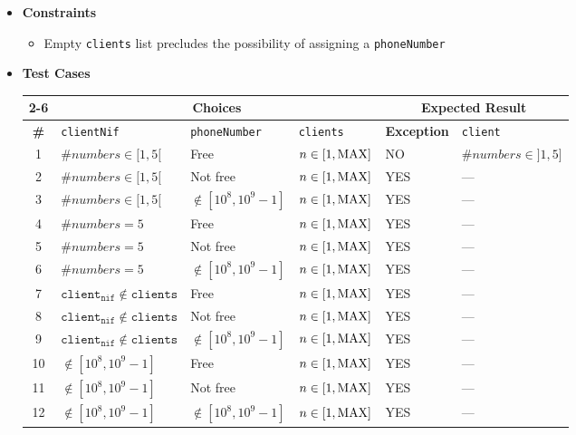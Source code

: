 \begin{itemize}
  \item \textbf{Constraints}
  \begin{itemize}
    \normalsize
    \item Empty \texttt{clients} list precludes the possibility of assigning a
          \texttt{phoneNumber}
  \end{itemize}

  \item \textbf{Test Cases}
  \begin{table}[!hbtp]
    \centering
    \normalsize
    \begin{tabular}{|c|l|l|l|l|l|}
      \cline{2-6}
      \multicolumn{1}{}{}
        & \multicolumn{3}{|c}{\textbf{Choices}}
        & \multicolumn{2}{|c|}{\textbf{Expected Result}} \\
      \hline
      \textbf{\#}
        & \texttt{clientNif} & \texttt{phoneNumber} & \texttt{clients}
        & \textbf{Exception} & \texttt{client} \\
      \hline
       1 & $\#numbers \in [1,5[$ & Free & $n \in [1,\rm{MAX}]$
         & NO & $\#numbers \in ]1,5]$ \\ \hline
       2 & $\#numbers \in [1,5[$ & Not free & $n \in [1,\rm{MAX}]$
         & YES & --- \\ \hline
       3 & $\#numbers \in [1,5[$ & $\notin [10^8,10^9-1]$ & $n \in [1,\rm{MAX}]$
         & YES & --- \\ \hline

       4 & $\#numbers = 5$ & Free & $n \in [1,\rm{MAX}]$
         & YES & --- \\ \hline
       5 & $\#numbers = 5$ & Not free & $n \in [1,\rm{MAX}]$
         & YES & --- \\ \hline
       6 & $\#numbers = 5$ & $\notin [10^8,10^9-1]$ & $n \in [1,\rm{MAX}]$
         & YES & --- \\ \hline


       7 & $\texttt{client}_{\texttt{nif}} \notin \texttt{clients}$
           & Free & $n \in [1,\rm{MAX}]$
         & YES & --- \\ \hline
       8 & $\texttt{client}_{\texttt{nif}} \notin \texttt{clients}$
           & Not free & $n \in [1,\rm{MAX}]$
         & YES & --- \\ \hline
       9 & $\texttt{client}_{\texttt{nif}} \notin \texttt{clients}$
           & $\notin [10^8,10^9-1]$ & $n \in [1,\rm{MAX}]$
         & YES & --- \\ \hline


      10 & $\notin [10^8,10^9-1]$ & Free & $n \in [1,\rm{MAX}]$
         & YES & --- \\ \hline
      11 & $\notin [10^8,10^9-1]$ & Not free & $n \in [1,\rm{MAX}]$
         & YES & --- \\ \hline
      12 & $\notin [10^8,10^9-1]$ & $\notin [10^8,10^9-1]$& $n \in [1,\rm{MAX}]$
         & YES & --- \\ \hline
    \end{tabular}
  \end{table}
\end{itemize}